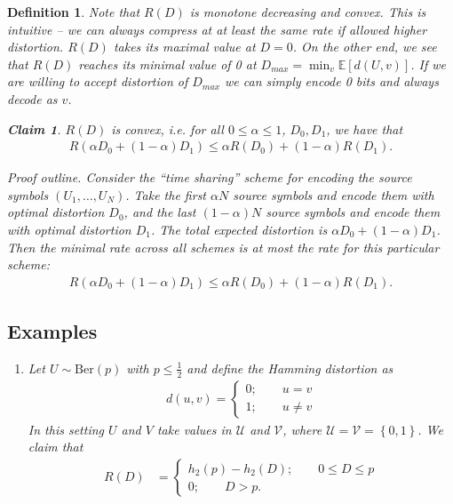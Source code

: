 \documentclass[13pt]{article}
\newtheorem*{definition}{Definition}
\newtheorem*{claim}{Claim}
\newcommand{\EE}{\mathbb{E}}
\newcommand{\UU}{\mathcal{U}}
\def\Ber{\text{Ber}}
\def\UU{\mathcal{U}}
\def\VV{\mathcal{V}}
\begin{document}
\begin{definition}
Note that $R(D)$ is monotone decreasing and convex.  This is intuitive -- we can always compress at at least the same rate if allowed higher distortion.  $R(D)$ takes its maximal value at $D = 0$.  On the other end, we see that $R(D)$ reaches its minimal value of 0 at $D_{max} = \min_v \EE[d(U,v)]$.  If we are willing to accept distortion of $D_{max}$ we can simply encode 0 bits and always decode as $v$.  

\begin{claim}
  $R(D)$ is convex, i.e. for all $0 \leq \alpha \leq 1$, $D_0, D_1$, we have that
  \begin{align*}
    R(\alpha D_0 + (1 - \alpha) D_1) \leq \alpha R (D_0) + (1 - \alpha) R(D_1).
  \end{align*}
\end{claim}

{\it Proof outline.}  Consider the ``time sharing'' scheme for encoding the source symbols $(U_1, \dots, U_N)$.  Take the first $\alpha N$ source symbols and encode them with optimal distortion $D_0$, and the last $(1 - \alpha) N$ source symbols and encode them with optimal distortion $D_1$.  The total expected distortion is $\alpha  D_0 + (1 - \alpha)  D_1$.  Then the minimal rate across all schemes is at most the rate for this particular scheme:
\begin{align*}
  R(\alpha D_0 + (1 - \alpha)D_1) \leq \alpha R(D_0) + (1 - \alpha) R(D_1).
\end{align*}

\subsection{Examples}

\begin{enumerate}
  \item Let $U \sim \Ber(p)$ with $p \leq \frac{1}{2}$ and define the Hamming distortion as
    \begin{align*}
      d(u, v) = 
      \begin{cases}
        0; \qquad u = v \\
        1; \qquad u \neq v
      \end{cases}
    \end{align*}
    In this setting $U$ and $V$ take values in $\UU$ and $\VV$, where $\UU = \VV = \left\{ 0, 1 \right\}$. We claim that
    \begin{align*}
      R(D) &=
      \begin{cases}
        h_2(p) - h_2(D); \qquad 0 \leq D \leq p \\
        0; \qquad D > p.
      \end{cases}
    \end{align*}


\end{enumerate}
\end{definition}
\end{document}
